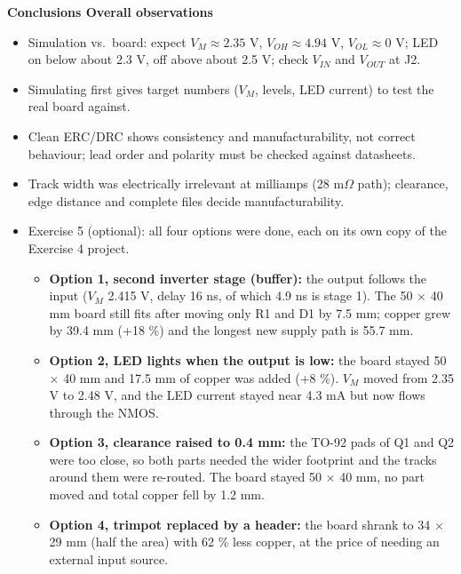 \documentclass[11pt,a4paper]{article}
\newcommand{\exhead}[2]{\Needspace{8\baselineskip}\vspace{8pt}\begin{tcolorbox}[enhanced,colback=teal,colframe=teal,arc=2pt,boxrule=0pt,left=8pt,right=8pt,top=3pt,bottom=3pt]\sffamily\bfseries\color{white}\large #1 \hfill{\normalsize\bfseries #2}\end{tcolorbox}\vspace{-2pt}}
\begin{document}
\exhead{Conclusions}{Overall observations}
\begin{itemize}
\item Simulation vs.\ board: expect $V_M\approx2.35$ V, $V_{OH}\approx4.94$ V, $V_{OL}\approx0$ V; LED on below about 2.3 V, off above about 2.5 V; check $V_{IN}$ and $V_{OUT}$ at J2.
\item Simulating first gives target numbers ($V_M$, levels, LED current) to test the real board against.
\item Clean ERC/DRC shows consistency and manufacturability, not correct behaviour; lead order and polarity must be checked against datasheets.
\item Track width was electrically irrelevant at milliamps (28 m$\Omega$ path); clearance, edge distance and complete files decide manufacturability.
\item Exercise 5 (optional): all four options were done, each on its own copy of the Exercise 4 project.
\begin{itemize}
\item \textbf{Option 1, second inverter stage (buffer):} the output follows the input ($V_M$ 2.415 V, delay 16 ns, of which 4.9 ns is stage 1). The 50 $\times$ 40 mm board still fits after moving only R1 and D1 by 7.5 mm; copper grew by 39.4 mm (+18 \%) and the longest new supply path is 55.7 mm.
\item \textbf{Option 2, LED lights when the output is low:} the board stayed 50 $\times$ 40 mm and 17.5 mm of copper was added (+8 \%). $V_M$ moved from 2.35 V to 2.48 V, and the LED current stayed near 4.3 mA but now flows through the NMOS.
\item \textbf{Option 3, clearance raised to 0.4 mm:} the TO-92 pads of Q1 and Q2 were too close, so both parts needed the wider footprint and the tracks around them were re-routed. The board stayed 50 $\times$ 40 mm, no part moved and total copper fell by 1.2 mm.
\item \textbf{Option 4, trimpot replaced by a header:} the board shrank to 34 $\times$ 29 mm (half the area) with 62 \% less copper, at the price of needing an external input source.
\end{itemize}
\end{itemize}
\end{document}
